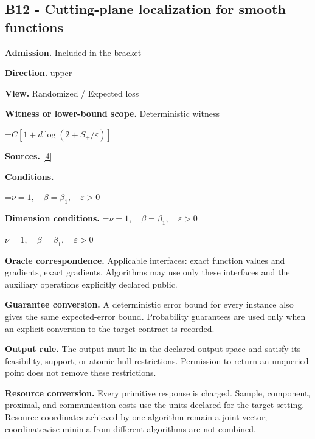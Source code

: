 \documentclass[10pt,a4paper]{article}
\newcommand{\AtlasMath}[1]{\par\begingroup\centering\setbox0=\hbox{$\displaystyle #1$}\ifdim\wd0>1.4\linewidth\typeout{ATLAS WIDE FORMULA: \the\wd0}\fi\ifdim\wd0>\linewidth\resizebox{\linewidth}{!}{\box0}\else\box0\fi\par\endgroup}
\newcommand{\AtlasInlineMath}[1]{\begingroup\setbox0=\hbox{$#1$}\ifdim\wd0>.4\linewidth\endgroup\AtlasMath{#1}\else\endgroup$#1$\fi}
\begin{document}
\subsection{B12 - Cutting-plane localization for smooth functions}


\textbf{Admission.} Included in the bracket



\textbf{Direction.} upper



\textbf{View.} Randomized / Expected loss



\textbf{Witness or lower-bound scope.} Deterministic witness



\AtlasMath{C[1+d\log(2+S_+/\varepsilon)]}


\textbf{Sources.} \href{https://arxiv.org/pdf/2609.32910}{[4]}



\textbf{Conditions.}
\AtlasMath{\nu=1,\quad\beta=\beta_1,\quad\varepsilon>0}




\textbf{Dimension conditions.} \AtlasInlineMath{\nu=1,\quad\beta=\beta_1,\quad\varepsilon>0}



\textbf{Oracle correspondence.} Applicable interfaces: exact function values and gradients, exact gradients. Algorithms may use only these interfaces and the auxiliary operations explicitly declared public.



\textbf{Guarantee conversion.} A deterministic error bound for every instance also gives the same expected-error bound. Probability guarantees are used only when an explicit conversion to the target contract is recorded.



\textbf{Output rule.} The output must lie in the declared output space and satisfy its feasibility, support, or atomic-hull restrictions. Permission to return an unqueried point does not remove these restrictions.



\textbf{Resource conversion.} Every primitive response is charged. Sample, component, proximal, and communication costs use the units declared for the target setting. Resource coordinates achieved by one algorithm remain a joint vector; coordinatewise minima from different algorithms are not combined.
\end{document}
